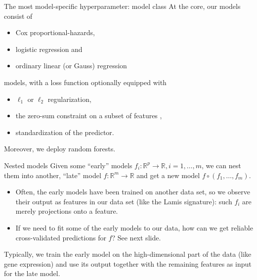 \documentclass[10pt, aspectratio=169]{beamer}
\def\RR{\mathbb{R}}
\begin{document}
\begin{frame}{The most model-specific hyperparameter: model class}
  At the core, our models consist of 
  \begin{itemize}
    \item Cox proportional-hazards,
    \item logistic regression and 
    \item ordinary linear (or Gauss) regression
  \end{itemize}
  models, \pause with a loss function optionally equipped with
  \begin{itemize}
    \item $\ell_1$ or $\ell_2$ regularization,
    \item the zero-sum constraint on a subset of features \cite{transplatform17},
    \item standardization of the predictor.
  \end{itemize}

  \pause
  Moreover, we deploy random forests.
\end{frame}

\begin{frame}{Nested models}
  Given some ``early'' models $f_i: \RR^p \to \RR, i = 1, \ldots, m$, we can nest 
  them into another, ``late'' model $f: \RR^m \to \RR$ and get a new model 
  $f \circ (f_1, \ldots, f_m)$.

  \pause
  \begin{itemize}
    \item Often, the early models have been trained on another data set, so we 
      observe their output as features in our data set (like the Lamis 
      signature): such $f_i$ are merely projections onto a feature.
    \item If we need to fit some of the early models to our data, how can we 
      get reliable cross-validated predictions for $f$? See next slide.
  \end{itemize}
  \pause

  Typically, we train the early  model on the high-dimensional 
  part of the data (like gene expression) and use its output together with the 
  remaining features as input for the late model.
\end{frame}
\end{document}
